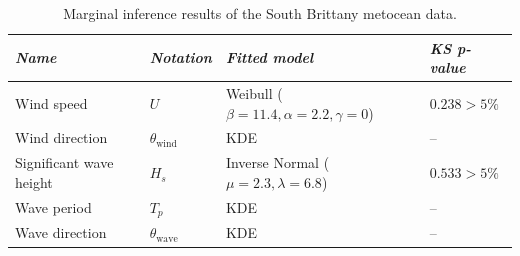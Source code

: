 \begin{table}[ht]
    \centering
    \begin{tabular}{llll}
        \hline
        {\it Name}              & {\it Notation}            & {\it Fitted model}                            & \textit{KS p-value}  \\
        \hline
        Wind speed              & $U$                       & Weibull ($\beta=11.4, \alpha=2.2, \gamma=0$)  & \textcolor{OliveGreen}{$0.238 > 5\%$}\\
        Wind direction          & $\theta_{\mathrm{wind}}$  & KDE                                           & --                                   \\ 
        Significant wave height & $H_s$                     & Inverse Normal ($\mu=2.3, \lambda=6.8$)       & \textcolor{OliveGreen}{$0.533 > 5\%$}\\
        Wave period             & $T_p$                     & KDE                                           & --                                   \\
        Wave direction          & $\theta_{\mathrm{wave}}$  & KDE                                           & --                                   \\
        \hline
    \end{tabular}
    \caption{Marginal inference results of the South Brittany metocean data.}
    \label{tab:sb_marginal_fit}
\end{table}

